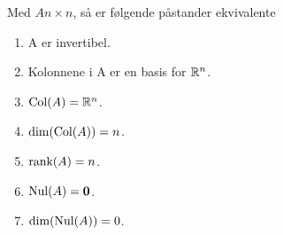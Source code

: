 Med $A n\times n$, så er følgende påstander ekvivalente
\begin{enumerate}
  \item A er invertibel.
  \item Kolonnene i A er en basis for $\mathbb{R}^n$.
  \item $\text{Col}(A) = \mathbb{R}^n$.
  \item $\text{dim}(\text{Col}(A)) = n$.
  \item $\text{rank}(A) = n$.
  \item $\text{Nul}(A) = {\mathbf{0}}$.
  \item $\text{dim}(\text{Nul}(A)) = 0$.
\end{enumerate}
